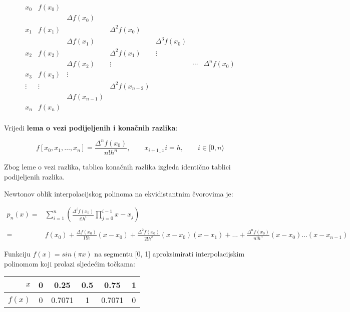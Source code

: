 \begin{tablebox}
    $$
    \begin{array}{ccccccc}
        x_0 & f(x_0) \\
        & & \Delta f(x_0) \\
        x_1 & f(x_1) & & \Delta^2 f(x_0) \\
        & & \Delta f(x_1) & & \Delta^3 f(x_0) \\
        x_2 & f(x_2) & & \Delta^2 f(x_1) & \vdots \\
        & & \Delta f(x_2) & \vdots & & \cdots & \Delta^n f(x_0) \\
        x_3 & f(x_3) & \vdots \\
        \vdots & \vdots & & \Delta^2 f(x_{n-2}) \\
        & & \Delta f(x_{n-1}) \\
        x_n & f(x_n) \\
    \end{array}
    $$
\end{tablebox}

Vrijedi \textbf{lema o vezi podijeljenih i konačnih razlika}:

$$
f[x_0,x_1,\dots,x_n] = \frac{\Delta^nf(x_0)}{n!h^n},\qquad x_{i+1_-x}i=h,\qquad i\in [0,n\rangle
$$

Zbog leme o vezi razlika, tablica konačnih razlika izgleda identično tablici podijeljenih razlika.

Newtonov oblik interpolacijskog polinoma na ekvidistantnim čvorovima je:

\begin{align}
p_n(x) =& \sum_{i=1}^{n}\left(\frac{\Delta^if(x_0)}{i!h^i}\prod_{j=0}^{i-1}x-x_j\right)\\\nonumber\\
=&f(x_0)
+\frac{\Delta f(x_0)}{1!h}(x-x_0)
+\frac{\Delta^2 f(x_0)}{2!h^2}(x-x_0)(x-x_1)
+\dots
+\frac{\Delta^n f(x_0)}{n!h^n}(x-x_0)\dots(x-x_{n-1})\nonumber
\end{align}

\newpage

\begin{example}
    Funkciju $f(x)=sin(\pi x)$ na segmentu [0, 1] aproksimirati interpolacijskim polinomom koji prolazi sljedećim točkama:

    \center
    \begin{tabular}{r|c|c|c|c|c}
        $x$ & 0 & 0.25 & 0.5 & 0.75 & 1\\
        \hline
        $f(x)$ & 0 & 0.7071 & 1 & 0.7071 & 0
    \end{tabular}
\end{example}

